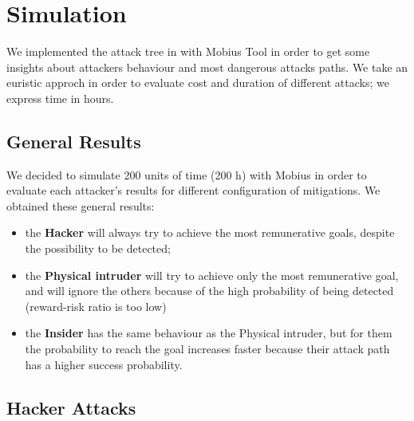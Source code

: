 %
\chapter{Simulation}\label{ch:simulation}

We implemented the attack tree in with Mobius Tool in order to get some insights about
attackers behaviour and most dangerous attacks paths. 
We take an euristic approch in order to evaluate cost and duration of different attacks; we 
express time in hours.
\section{General Results}
We decided to simulate 200 units of time (200 h) with Mobius in order to evaluate each attacker's results for 
different configuration of mitigations. We obtained these general results:\\
\begin{itemize}
    \item the \textbf{Hacker} will always try to achieve the most remunerative goals, despite the
        possibility to be detected; 
    \item the \textbf{Physical intruder} will try to achieve only the most remunerative goal, and will
        ignore the others because of the high probability of being detected (reward-risk ratio is too low)
    \item the \textbf{Insider} has the same behaviour as the Physical intruder, but for them the probability
        to reach the goal increases faster because their attack path has a higher success probability.
\end{itemize}
\newpage
\section{Hacker Attacks}
